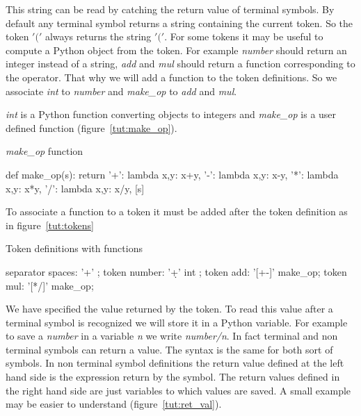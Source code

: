This string can be read by catching the return value of terminal symbols. By default any terminal symbol returns a string containing the current token. So the token $'('$ always returns the string $'('$. For some tokens it may be useful to compute a Python object from the token. For example \emph{number} should return an integer instead of a string, \emph{add} and \emph{mul} should return a function corresponding to the operator. That why we will add a function to the token definitions. So we associate \emph{int} to \emph{number} and \emph{make\_op} to \emph{add} and \emph{mul}.

\emph{int} is a Python function converting objects to integers and \emph{make\_op} is a user defined function (figure~\ref{tut:make_op}).

\begin{code}
\caption{\emph{make\_op} function}							\label{tut:make_op}
\begin{verbatimtab}[4]
def make_op(s):
	return {
		'+': lambda x,y: x+y,
		'-': lambda x,y: x-y,
		'*': lambda x,y: x*y,
		'/': lambda x,y: x/y,
	}[s]
\end{verbatimtab}
\end{code}

To associate a function to a token it must be added after the token definition as in figure~\ref{tut:tokens}

\begin{code}
\caption{Token definitions with functions}					\label{tut:tokens}
\begin{verbatimtab}[4]
	separator spaces: '\s+' ;
	token number: '\d+' int ;
	token add: '[+-]' make_op;
	token mul: '[*/]' make_op;
\end{verbatimtab}
\end{code}

We have specified the value returned by the token. To read this value after a terminal symbol is recognized we will store it in a Python variable. For example to save a \emph{number} in a variable \emph{n} we write \emph{number/n}.
In fact terminal and non terminal symbols can return a value. The syntax is the same for both sort of symbols. In non terminal symbol definitions the return value defined at the left hand side is the expression return by the symbol. The return values defined in the right hand side are just variables to which values are saved. A small example may be easier to understand (figure~\ref{tut:ret_val}).

